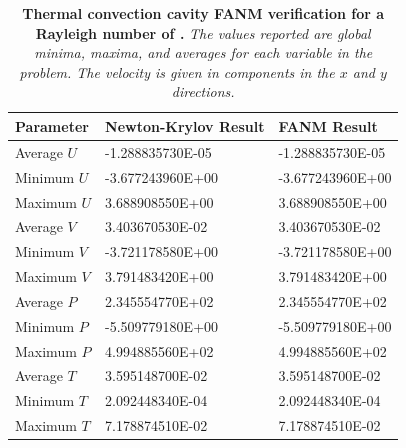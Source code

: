 \begin{table}[h!]
  \begin{center}
    \begin{tabular}{lll}\hline\hline
      \multicolumn{1}{l}{Parameter}& 
      \multicolumn{1}{l}{Newton-Krylov Result}&
      \multicolumn{1}{l}{FANM Result}\\
      \hline
      Average $U$ & -1.288835730E-05 & -1.288835730E-05 \\
      Minimum $U$ & -3.677243960E+00 & -3.677243960E+00 \\
      Maximum $U$ & 3.688908550E+00 & 3.688908550E+00 \\
      \hline
      Average $V$ & 3.403670530E-02 & 3.403670530E-02 \\
      Minimum $V$ & -3.721178580E+00 & -3.721178580E+00 \\
      Maximum $V$ & 3.791483420E+00 & 3.791483420E+00 \\
      \hline
      Average $P$ & 2.345554770E+02 & 2.345554770E+02 \\
      Minimum $P$ & -5.509779180E+00 & -5.509779180E+00 \\
      Maximum $P$ & 4.994885560E+02 & 4.994885560E+02 \\
      \hline
      Average $T$ & 3.595148700E-02 & 3.595148700E-02 \\
      Minimum $T$ & 2.092448340E-04 & 2.092448340E-04 \\
      Maximum $T$ & 7.178874510E-02 & 7.178874510E-02 \\
      \hline\hline
    \end{tabular}
  \end{center}
  \caption{\textbf{Thermal convection cavity FANM verification for a
      Rayleigh number of .} \textit{The values reported are
      global minima, maxima, and averages for each variable in the
      problem. The velocity is given in components in the $x$ and $y$
      directions.}}
  \label{tab:convection_ra1e3_results}
\end{table}

